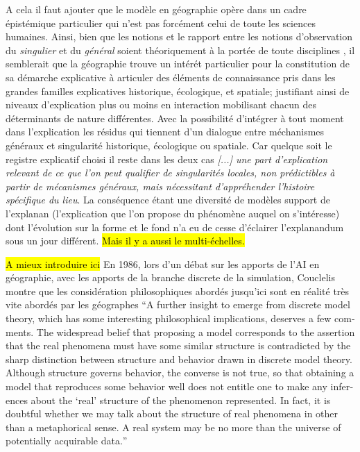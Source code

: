 A cela il faut ajouter que le modèle en géographie opère dans un cadre épistémique particulier qui n'est pas forcément celui de toute les sciences humaines. Ainsi, bien que les notions et le rapport entre les notions d'observation du \textit{singulier} et du \textit{général} soient théoriquement à la portée de toute disciplines \autocite{Dastes1992}, il semblerait que la géographie trouve un intérét particulier pour la constitution de sa démarche explicative à articuler des éléments de connaissance pris dans les grandes familles explicatives historique, écologique, et spatiale; justifiant ainsi de niveaux d'explication plus ou moins en interaction mobilisant chacun des déterminants de nature différentes. Avec la possibilité d'intégrer à tout moment dans l'explication les résidus qui tiennent d'un dialogue entre méchanismes généraux et singularité historique, écologique ou spatiale. Car quelque soit le registre explicatif choisi il reste dans les deux cas \textit{ [...] une part d'explication relevant de ce que l'on peut qualifier de singularités locales, non prédictibles à partir de mécanismes généraux, mais nécessitant d'appréhender l'histoire spécifique du lieu}. La conséquence étant une diversité de modèles support de l'explanan (l’explication que l’on propose du phénomène auquel on s’intéresse) dont l'évolution sur la forme et le fond n'a eu de cesse d'éclairer l'explanandum sous un jour différent. \autocite{Dastes1992, Sanders2000, Sanders2013} \hl{Mais il y a aussi le multi-échelles.}

\hl{A mieux introduire ici} En 1986, lors d'un débat sur les apports de l'AI en géographie, avec les apports de la branche discrete de la simulation, Couclelis montre que les considération philosophiques abordés jusqu'ici sont en réalité très vite abordés par les géographes \foreignquote{english}{A further insight to emerge from discrete model theory, which has some interesting philosophical implications, deserves a few comments. The widespread belief that proposing a model corresponds to the assertion that the real phenomena must have some similar structure is contradicted by the sharp distinction between structure and behavior drawn in discrete model theory. Although structure governs behavior, the converse is not true, so that obtaining a model that reproduces some behavior well does not entitle one to make any inferences about the \enquote{real} structure of the phenomenon represented. In fact, it is doubtful whether we may talk about the structure of real phenomena in other than a metaphorical sense. A real system may be no more than the universe of potentially acquirable data.} \autocite{Couclelis1986}

